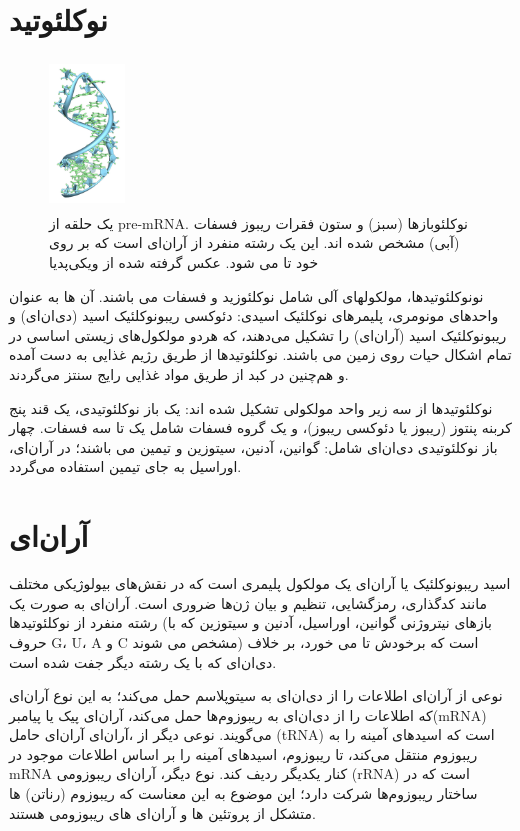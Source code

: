 \documentclass[12pt,a4paper,BCOR=.7cm,headsepline,bibliography=totoc]{report}
\begin{document}
\section{نوکلئوتید}
\begin{figure}
\centering
\includegraphics[width=2cm, height=4cm]{pictures/Pre-mRNA-1ysv-tubes.png}
\caption{
یک حلقه از pre-mRNA. نوکلئوبازها (سبز) و ستون فقرات ریبوز فسفات (آبی) مشخص شده اند. این یک رشته منفرد از آر‌ان‌ای است که بر روی خود تا می شود. عکس گرفته شده از ویکی‌پدیا
}\label{wrap-fig:1}
\end{figure}
نونوکلئوتیدها، مولکولهای آلی شامل نوکلئوزید و فسفات می باشند. آن ها به عنوان واحدهای مونومری، پلیمرهای نوکلئیک اسیدی: دئوکسی ریبونوکلئیک اسید (دی‌ان‌ای) و ریبونوکلئیک اسید (آر‌ان‌ای) را تشکیل می‌دهند، که هردو مولکول‌های زیستی اساسی در تمام اشکال حیات روی زمین می باشند. نوکلئوتیدها از طریق رژیم غذایی به دست آمده و هم‌چنین در کبد از طریق مواد غذایی رایج سنتز می‌گردند.\cite{Nucleotide}

نوکلئوتیدها از سه زیر واحد مولکولی تشکیل شده اند: یک باز نوکلئوتیدی، یک قند پنج کربنه پنتوز (ریبوز یا دئوکسی ریبوز)، و یک گروه فسفات شامل یک تا سه فسفات. چهار باز نوکلئوتیدی دی‌ان‌ای شامل: گوانین، آدنین، سیتوزین و تیمین می باشند؛ در آر‌ان‌ای، اوراسیل به جای تیمین استفاده می‌گردد.

\section{آر‌ان‌ای}

اسید ریبونوکلئیک یا آر‌ان‌ای
 یک مولکول پلیمری است که در نقش‌های بیولوژیکی مختلف مانند کدگذاری، رمزگشایی، تنظیم و بیان ژن‌ها ضروری است. آر‌ان‌ای به صورت یک رشته منفرد از نوکلئوتیدها (بازهای نیتروژنی گوانین، اوراسیل، آدنین و سیتوزین که با حروف G، U، A و C مشخص می شوند) است که برخودش تا می خورد، بر خلاف دی‌ان‌ای که با یک رشته دیگر جفت شده است.
 
نوعی از آر‌ان‌ای اطلاعات را از دی‌ان‌ای به سیتوپلاسم حمل می‌کند؛ به این نوع آر‌ان‌ای که اطلاعات را از دی‌ان‌ای به ریبوزوم‌ها حمل می‌کند، آر‌ان‌ای پیک یا پیامبر(mRNA) می‌گویند. نوعی دیگر از ،آر‌ان‌ای
آر‌ان‌ای
 حامل (tRNA) است که اسیدهای آمینه را به ریبوزوم منتقل می‌کند، تا ریبوزوم، اسیدهای آمینه را بر اساس اطلاعات موجود در mRNA کنار یکدیگر ردیف کند. نوع دیگر، آر‌ان‌ای ریبوزومی (rRNA) است که در ساختار ریبوزوم‌ها شرکت دارد؛ این موضوع به این معناست که ریبوزوم (رناتن) ها متشکل از پروتئین ها و آر‌ان‌ای های ریبوزومی هستند.
\end{document}
